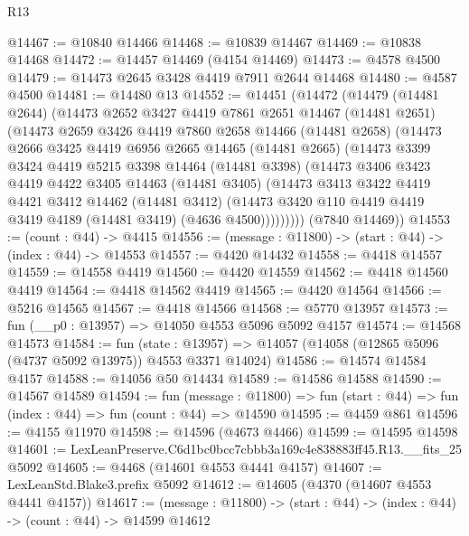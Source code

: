 \begin{lexlean}{R13}
\begin{coremodule}
@14467 := @10840 @14466
@14468 := @10839 @14467
@14469 := @10838 @14468
@14472 := @14457 @14469 (@4154 @14469)
@14473 := @4578 @4500
@14479 := @14473 @2645 @3428 @4419 @7911 @2644 @14468
@14480 := @4587 @4500
@14481 := @14480 @13
@14552 := @14451
    (@14472
      (@14479
        (@14481 @2644)
        (@14473
          @2652
          @3427
          @4419
          @7861
          @2651
          @14467
          (@14481 @2651)
          (@14473
            @2659
            @3426
            @4419
            @7860
            @2658
            @14466
            (@14481 @2658)
            (@14473
              @2666
              @3425
              @4419
              @6956
              @2665
              @14465
              (@14481 @2665)
              (@14473
                @3399
                @3424
                @4419
                @5215
                @3398
                @14464
                (@14481 @3398)
                (@14473
                  @3406
                  @3423
                  @4419
                  @4422
                  @3405
                  @14463
                  (@14481 @3405)
                  (@14473
                    @3413
                    @3422
                    @4419
                    @4421
                    @3412
                    @14462
                    (@14481 @3412)
                    (@14473 @3420 @110 @4419 @4419 @3419 @4189 (@14481 @3419) (@4636 @4500)))))))))
      (@7840 @14469))
@14553 := (count : @44) -> @4415
@14556 := (message : @11800) -> (start : @44) -> (index : @44) -> @14553
@14557 := @4420 @14432
@14558 := @4418 @14557
@14559 := @14558 @4419
@14560 := @4420 @14559
@14562 := @4418 @14560 @4419
@14564 := @4418 @14562 @4419
@14565 := @4420 @14564
@14566 := @5216 @14565
@14567 := @4418 @14566
@14568 := @5770 @13957
@14573 := fun (__p0 : @13957) => @14050 @4553 @5096 @5092 @4157
@14574 := @14568 @14573
@14584 := fun (state : @13957) =>
  @14057 (@14058 (@12865 @5096 (@4737 @5092 @13975)) @4553 @3371 @14024)
@14586 := @14574 @14584 @4157
@14588 := @14056 @50 @14434
@14589 := @14586 @14588
@14590 := @14567 @14589
@14594 := fun (message : @11800) =>
  fun (start : @44) => fun (index : @44) => fun (count : @44) => @14590
@14595 := @4459 @861
@14596 := @4155 @11970
@14598 := @14596 (@4673 @4466)
@14599 := @14595 @14598
@14601 := LexLeanPreserve.C6d1bc0bcc7cbbb3a169c4e838883ff45.R13.__fits_25 @5092
@14605 := @4468 (@14601 @4553 @4441 @4157)
@14607 := LexLeanStd.Blake3.prefix @5092
@14612 := @14605 (@4370 (@14607 @4553 @4441 @4157))
@14617 := (message : @11800) -> (start : @44) -> (index : @44) -> (count : @44) -> @14599 @14612

\end{coremodule}
\end{lexlean}
